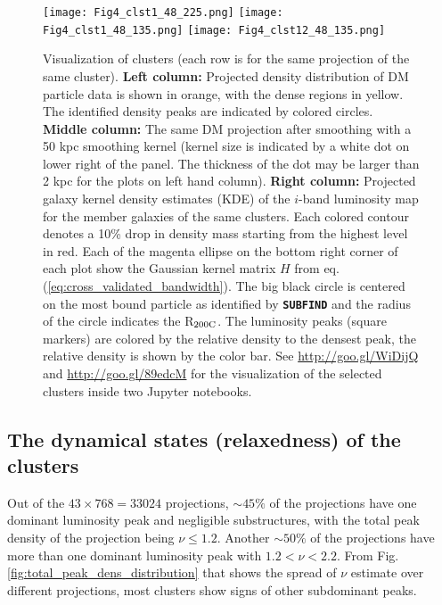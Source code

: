 \begin{figure*}
	\begin{center}
	\texttt{[image: Fig4\_clst1\_48\_225.png]}
	\texttt{[image: Fig4\_clst1\_48\_135.png]}
	\texttt{[image: Fig4\_clst12\_48\_135.png]}
	\caption{	Visualization of clusters (each row is for the same projection
		of the same cluster). {\bf Left column:} Projected density distribution of DM	
		particle data is shown in orange, with the dense regions in yellow. 
		The identified density peaks are indicated by colored circles. 
		{\bf Middle column:} The same DM projection after smoothing with a 50 
		kpc smoothing kernel (kernel size is indicated by a white dot on lower right of
		the panel. The thickness of the dot may be larger than 2 kpc
		for the plots on left hand column).
		{\bf Right column:} Projected galaxy kernel density estimates (KDE) of 
		the $i$-band luminosity map for the member
		galaxies of the same clusters. Each colored contour denotes a 10\% drop 
		in density mass starting from the highest level in red. Each of 
		the magenta ellipse on the
		bottom right corner of each plot show the Gaussian kernel matrix 
		$H$ from eq. (\ref{eq:cross_validated_bandwidth}). 
		The big black 
		circle is centered on the most bound particle as identified by {\bf
		\texttt{SUBFIND}} and the radius of the circle indicates the 
		R$_{\rm 200C}$. The luminosity peaks (square markers) are colored
		by the relative density to the densest peak, the relative density  
		is shown by the color bar.  
		See \href{http://goo.gl/WiDijQ}{http://goo.gl/WiDijQ} 
		and \href{http://goo.gl/89edcM}{http://goo.gl/89edcM} for the 
		visualization of the selected clusters inside two Jupyter notebooks.
		\label{fig:select_peak_visualization}
	}
\end{center}
\end{figure*}

\subsection{The dynamical states (relaxedness) of the clusters}
Out of the $43 \times 768 = 33 024$ projections, $\sim 45\%$ of the projections 
have one dominant luminosity peak and negligible substructures, with the total peak density of the
projection being $\nu \leq 1.2$. 
Another $\sim 50\%$ of the projections have more than one dominant luminosity
peak with $1.2 < \nu < 2.2$. 
From Fig. \ref{fig:total_peak_dens_distribution} that shows the spread of $\nu$
estimate over different projections, 
most clusters show signs of other subdominant peaks.

